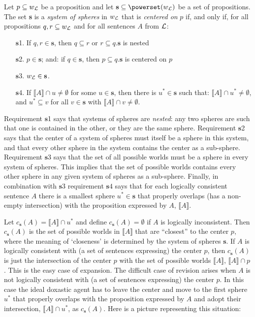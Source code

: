 Let $p\subseteq w_{\cal L}$ be a proposition and let $\textbf{s}\subseteq\powerset\!\left(w_{\cal L}\right)$ be a set of propositions. The set \textbf{s} is a \emph{system of spheres} in $w_{\cal L}$ that is \emph{centered on} $p$ if, and only if, for all propositions $q,r\subseteq w_{\cal L}$ and for all sentences $A$ from $\cal L$:
\begin{enumerate}
\item[$\textbf{s}$1.] If $q,r\in\textbf{s}$, then $q\subseteq r$ or $r\subseteq q$.\hfill $\textbf{s}$ is nested
\item[$\textbf{s}$2.] $p\in\textbf{s}$; and: if $q\in\textbf{s}$, then $p\subseteq q$.\hfill $\textbf{s}$ is centered on $p$
\item[$\textbf{s}$3.] $w_{\cal L}\in\textbf{s}$.
\item[$\textbf{s}$4.] If $\llbracket A\rrbracket\cap u\neq\emptyset$ for some $u\in\textbf{s}$, then there is $u^*\in\textbf{s}$ such that: $\llbracket A\rrbracket\cap u^*\neq\emptyset$, and $u^*\subseteq v$ for all $v\in\textbf{s}$ with $\llbracket A\rrbracket\cap v\neq\emptyset$.
\end{enumerate}
Requirement $\textbf{s}$1 says that systems of spheres are \emph{nested}: any two spheres are such that one is contained in the other, or they are the same sphere. Requirement $\textbf{s}$2
says that the center of a system of spheres must itself be a sphere in this system, and that every other sphere in the system contains the center as a sub-sphere. Requirement $\textbf{s}$3 says that the set of all possible worlds must be a sphere in every system of spheres. This implies that the set of possible worlds contains every other sphere in any given system of spheres as a sub-sphere. Finally, in combination with $\textbf{s}3$ requirement $\textbf{s}4$ says that for each logically consistent sentence $A$ there is a smallest sphere $u^*\in\textbf{s}$ that properly overlaps (has a non-empty intersection) with the proposition expressed by $A$, $\llbracket A\rrbracket$.

Let $c_{\textbf{s}}\left(A\right)=\llbracket A\rrbracket\cap u^*$ and define $c_{\textbf{s}}\left(A\right)=\emptyset$ if $A$ is logically inconsistent. Then $c_{\textbf{s}}\left(A\right)$ is the set of possible worlds in $\llbracket A\rrbracket$ that are ``closest'' to the center $p$, where the meaning of `closeness' is determined by the system of spheres $\textbf{s}$. If $A$ is logically consistent with (a set of sentences expressing) the center $p$, then $c_{\textbf{s}}\left(A\right)$ is just the intersection of the center $p$ with the set of possible worlds $\llbracket A\rrbracket$, $\llbracket A\rrbracket\cap p$. This is the easy case of expansion. The difficult case of revision arises when $A$ is not logically consistent with (a set of sentences expressing) the center $p$. In this case the ideal doxastic agent has to leave the center and move to the first sphere $u^*$ that properly overlaps with the proposition expressed by $A$ and adopt their intersection, $\llbracket A\rrbracket\cap u^*$, as $c_{\textbf{s}}\left(A\right)$. Here is a picture representing this situation:

